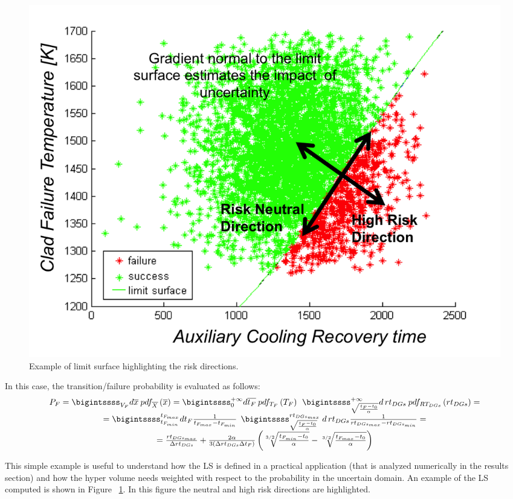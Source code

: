 \begin{figure}[h!]
  \centering
  \includegraphics[width=1.0\textwidth]  {pics/ExampleLSwitRiskDirections.png}
  \caption{Example of limit surface highlighting the risk directions.}
  \label{fig:ExampleLSwitRiskDirections}
\end{figure}
In this case, the transition/failure probability is evaluated as follows:
\begin{equation}
\begin{matrix} 
P_{F} = \bigintssss_{V_{F}}d\overline{x}\: pdf_{\overline{X}}\left ( \overline{x} \right ) 
= \bigintssss_{0}^{+\infty }d\overline{t_{F}}\: pdf_{T_{F}}\left ( T_{F} \right )\: \: \bigintssss_{\sqrt{\frac{t_{F}-t_{0}}{\alpha}}}^{+\infty } d\, rt_{DGs} \: pdf_{RT_{DGs}}\left ( rt_{DGs} \right )  =
\\
= \bigintssss_{t_{F_{min}}}^{t_{F_{max}}} dt_{F}\frac{1}{t_{F_{max}}-t_{F_{min}}}\: \: \bigintssss_{\sqrt{\frac{t_{F}-t_{0}}{\alpha}}}^{ rt_{DGs_{max}}}\: d\, rt_{DGs} \frac{1}{rt_{DGs_{max}}-rt_{DGs_{min}}} =
\\
= \frac{rt_{DGs_{max}}}{\Delta rt_{DGs}} + \frac{2\alpha}{3\left ( \Delta rt_{DGs}\Delta t_{F} \right )}
\left ( \sqrt[3/2]{\frac{t_{F_{min}}-t_{0}}{\alpha}} - \sqrt[3/2]{\frac{t_{F_{max}}-t_{0}}{\alpha}} \right )
\end{matrix}
\end{equation}

This simple example is useful to understand how the LS is defined in a practical application (that is analyzed numerically in the results section) and how the hyper volume needs weighted with respect to the probability in the uncertain domain. An example of the LS computed is shown in Figure ~\ref{fig:ExampleLSwitRiskDirections}.
In this figure the neutral and high risk directions are highlighted. 

